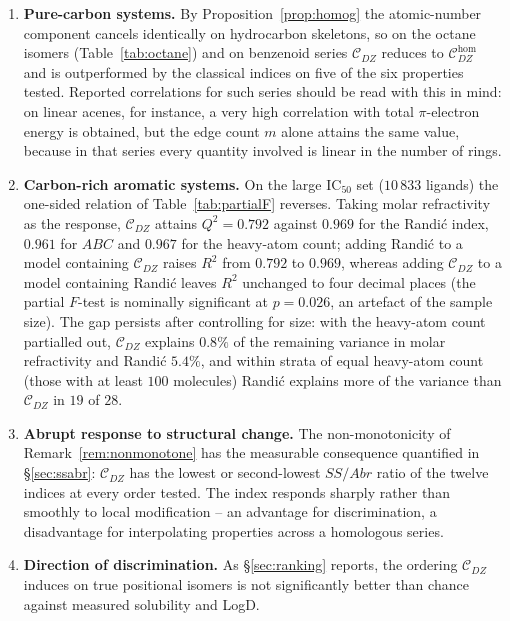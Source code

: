 \documentclass[11pt,a4paper]{article}
\theoremstyle{plain}
\theoremstyle{definition}
\theoremstyle{remark}
\newcommand{\CDZ}{\mathcal{C}_{DZ}}
\newcommand{\CDZhom}{\mathcal{C}_{DZ}^{\mathrm{hom}}}
\begin{document}
\begin{enumerate}
\item \textbf{Pure-carbon systems.} By Proposition~\ref{prop:homog} the
      atomic-number component cancels identically on hydrocarbon skeletons, so on
      the octane isomers (Table~\ref{tab:octane}) and on benzenoid series $\CDZ$
      reduces to $\CDZhom$ and is outperformed by the classical indices on five
      of the six properties tested. Reported
      correlations for such series should be read with this in mind: on linear
      acenes, for instance, a very high correlation with total $\pi$-electron
      energy is obtained, but the edge count $m$ alone attains the same value,
      because in that series every quantity involved is linear in the number of
      rings.
\item \textbf{Carbon-rich aromatic systems.} On the large IC$_{50}$ set ($10\,833$ ligands)
      the one-sided relation of Table~\ref{tab:partialF} reverses. Taking molar
      refractivity as the response, $\CDZ$ attains $Q^2=0.792$ against $0.969$
      for the Randi\'c index, $0.961$ for $ABC$ and $0.967$ for the heavy-atom
      count; adding Randi\'c to a model containing $\CDZ$ raises $R^2$ from
      $0.792$ to $0.969$, whereas adding $\CDZ$ to a model containing Randi\'c
      leaves $R^2$ unchanged to four decimal places (the partial $F$-test is
      nominally significant at $p=0.026$, an artefact of the sample size).
      The gap persists after controlling for size: with the heavy-atom count
      partialled out, $\CDZ$ explains $0.8\%$ of the remaining variance in molar
      refractivity and Randi\'c $5.4\%$, and within strata of equal heavy-atom
      count (those with at least $100$ molecules) Randi\'c explains more of the
      variance than $\CDZ$ in $19$ of $28$.
\item \textbf{Abrupt response to structural change.} The non-monotonicity of
      Remark~\ref{rem:nonmonotone} has the measurable consequence quantified in
      \S\ref{sec:ssabr}: $\CDZ$ has the lowest or second-lowest $SS/Abr$ ratio
      of the twelve indices at every order tested. The index responds sharply
      rather than smoothly to local modification -- an advantage for
      discrimination, a disadvantage for interpolating properties across a
      homologous series.
\item \textbf{Direction of discrimination.} As \S\ref{sec:ranking} reports, the
      ordering $\CDZ$ induces on true positional isomers is not significantly
      better than chance against measured solubility and LogD.

\end{enumerate}
\end{document}
